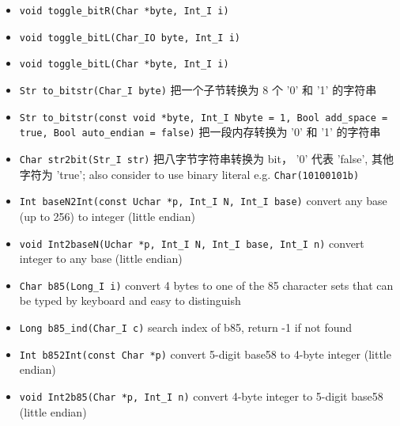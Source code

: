 \begin{itemize}
\item \verb|void toggle_bitR(Char *byte, Int_I i)|
\item \verb|void toggle_bitL(Char_IO byte, Int_I i)|
\item \verb|void toggle_bitL(Char *byte, Int_I i)|
\item \verb|Str to_bitstr(Char_I byte)| 把一个子节转换为 8 个 '0' 和 '1' 的字符串
\item \verb|Str to_bitstr(const void *byte, Int_I Nbyte = 1, Bool add_space = true, Bool auto_endian = false)| 把一段内存转换为 '0' 和 '1' 的字符串
\item \verb|Char str2bit(Str_I str)| 把八字节字符串转换为 bit， '0' 代表 'false', 其他字符为 'true'; also consider to use binary literal e.g. \verb`Char(10100101b)`
\item \verb|Int baseN2Int(const Uchar *p, Int_I N, Int_I base)| convert any base (up to 256) to integer (little endian)
\item \verb|void Int2baseN(Uchar *p, Int_I N, Int_I base, Int_I n)| convert integer to any base (little endian)
\item \verb|Char b85(Long_I i)| convert 4 bytes to one of the 85 character sets that can be typed by keyboard and easy to distinguish
\item \verb|Long b85_ind(Char_I c)| search index of b85, return -1 if not found
\item \verb|Int b852Int(const Char *p)| convert 5-digit base58 to 4-byte integer (little endian)
\item \verb|void Int2b85(Char *p, Int_I n)| convert 4-byte integer to 5-digit base58 (little endian)
\end{itemize}
